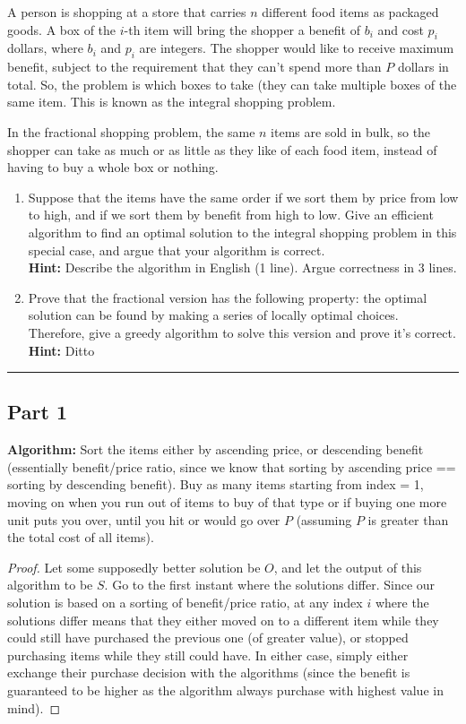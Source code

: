 \documentclass[11pt]{article}
\begin{document}
A person is shopping at a store that carries $n$ different food items as packaged goods. A box of the $i$-th item will bring the shopper a benefit of $b_i$ and cost $p_i$ dollars, where $b_i$ and $p_i$ are integers. The shopper would like to receive maximum benefit, subject to the requirement that they can't spend more than $P$ dollars in total. So, the problem is which boxes to take (they can take multiple boxes of the same item. This is known as the integral shopping problem.

In the fractional shopping problem, the same $n$ items are sold in bulk, so the shopper can take as much or as little as they like of each food item, instead of having to buy a whole box or nothing.

\begin{enumerate}
\item Suppose that the items have the same order if we sort them by price from low to high, and if we sort them by benefit from high to low. Give an efficient algorithm to find an optimal solution to the integral shopping problem in this special case, and argue that your algorithm is correct.\\
\textbf{Hint:} Describe the algorithm in English (1 line). Argue correctness in 3 lines.
\item Prove that the fractional version has the following property: the optimal solution can be found by making a series of locally optimal choices. Therefore, give a greedy algorithm to solve this version and prove it's correct.\\
\textbf{Hint:} Ditto
\end{enumerate}
\noindent\rule{17cm}{0.4pt}

\subsection*{Part 1}
\textbf{Algorithm:} Sort the items either by ascending price, or descending benefit (essentially benefit/price ratio, since we know that sorting by ascending price == sorting by descending benefit). Buy as many items starting from index = 1, moving on when you run out of items to buy of that type or if buying one more unit puts you over, until you hit or would go over $P$ (assuming $P$ is greater than the total cost of all items).
\begin{proof}
Let some supposedly better solution be $O$, and let the output of this algorithm to be $S$. Go to the first instant where the solutions differ. Since our solution is based on a sorting of benefit/price ratio, at any index $i$ where the solutions differ means that they either moved on to a different item while they could still have purchased the previous one (of greater value), or stopped purchasing items while they still could have. In either case, simply either exchange their purchase decision with the algorithms (since the benefit is guaranteed to be higher as the algorithm always purchase with highest value in mind).
\end{proof}
\end{document}
